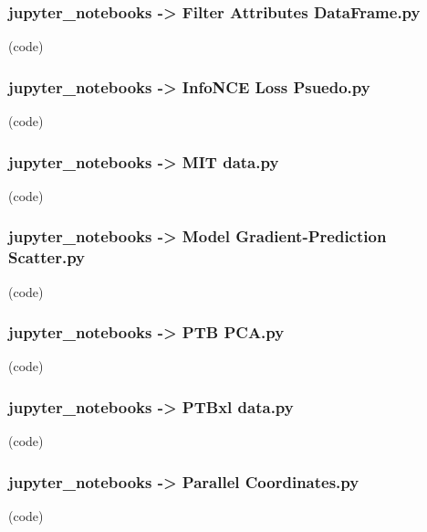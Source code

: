 \begin{myparindent}{0pt}

\noindent\subsubsection[Filter Attributes DataFrame.py]{jupyter\_notebooks -> Filter Attributes DataFrame.py} (code)

\noindent\subsubsection[InfoNCE Loss Psuedo.py]{jupyter\_notebooks -> InfoNCE Loss Psuedo.py} (code)

\noindent\subsubsection[MIT data.py]{jupyter\_notebooks -> MIT data.py} (code)

\noindent\subsubsection[Model Gradient-Prediction Scatter.py]{jupyter\_notebooks -> Model Gradient-Prediction Scatter.py} (code)

\noindent\subsubsection[PTB PCA.py]{jupyter\_notebooks -> PTB PCA.py} (code)

\noindent\subsubsection[PTBxl data.py]{jupyter\_notebooks -> PTBxl data.py} (code)

\noindent\subsubsection[Parallel Coordinates.py]{jupyter\_notebooks -> Parallel Coordinates.py} (code)

\end{myparindent}
